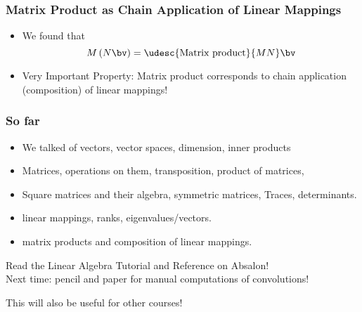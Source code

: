 \documentclass[8pt]{beamer}
\begin{document}
\begin{frame}
  \frametitle{Matrix Product as Chain Application of Linear Mappings}
  \begin{itemize}
  \item We found that 
    $$
    M\left (N\bv\right) = \udesc{\text{Matrix product}}{M N}\bv
    $$
  \item Very Important Property: Matrix product corresponds to chain application (composition) of linear mappings!
  \end{itemize}
\end{frame}

\begin{frame}
  \frametitle{So far}
  \begin{itemize}
  \item We talked of vectors, vector spaces, dimension, inner products
  \item Matrices, operations on them, transposition, product of matrices,
    \item Square matrices and their algebra, symmetric matrices, Traces, determinants.
    \item linear mappings, ranks, eigenvalues/vectors.
    \item matrix products and composition of linear mappings.
  \end{itemize}
\vfill
  \begin{center}
    \large
    Read the Linear Algebra Tutorial and Reference on Absalon!\\
    Next time: pencil and paper for manual computations of convolutions!
  \end{center}
  This will also be useful for other courses!
\end{frame}
\end{document}
